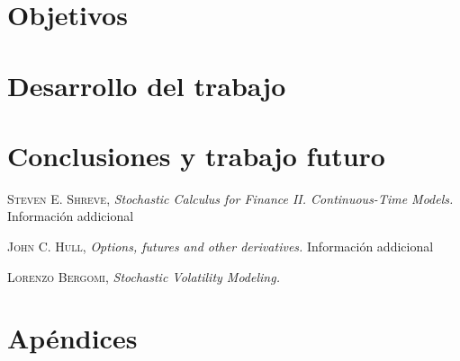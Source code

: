 \documentclass[11pt,a4paper,spanish]{book}
\begin{document}
\chapter{Objetivos}

\cleardoublepage

\chapter{Desarrollo del trabajo}

\cleardoublepage

\chapter{Conclusiones y trabajo futuro}

\cleardoublepage


\begin{thebibliography}{a}

 \textsc{Steven E. Shreve},
\textit{Stochastic Calculus for Finance II. Continuous-Time Models.}
Información addicional

 \textsc{John C. Hull},
\textit{Options, futures and other derivatives.}
Información addicional

 \textsc{Lorenzo Bergomi},
\textit{Stochastic Volatility Modeling.}

\end{thebibliography}
% 
%

\appendix
\chapter{Apéndices}
\end{document}
